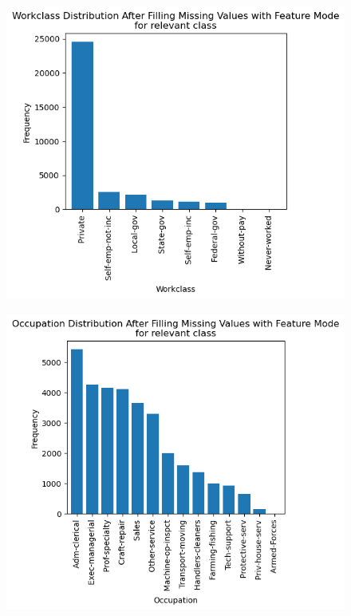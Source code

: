 \documentclass{article}
\begin{document}
    \newpage

    \begin{center}
        \begin{minipage}[t]{0.9\textwidth}
            \begin{figure}[H]
                \centering
                \includegraphics[width=1\textwidth, height=0.4\textheight]{./2_3ci.png}
            \end{figure}
            \begin{figure}[H]
                \centering
                \includegraphics[width=1\textwidth, height=0.4\textheight]{./2_3cii.png}
            \end{figure}
        \end{minipage}
    \end{center}
\end{document}
